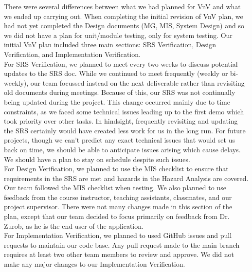 \documentclass[12pt, titlepage]{article}
\begin{document}
\indent There were several differences between what we had planned for VnV and what we ended up carrying out. When completing the initial revision of VnV plan, we had not yet completed the Design documents (MG, MIS, System Design) and so we did not have a plan for unit/module testing, only for system testing. Our initial VnV plan included three main sections: SRS Verification, Design Verification, and Implementation Verification.\\

\indent For SRS Verification, we planned to meet every two weeks to discuss potential updates to the SRS doc. While we continued to meet frequently (weekly or bi-weekly), our team focussed instead on the next deliverable rather than revisiting old documents during meetings. Because of this, our SRS was not continually being updated during the project. This change occurred mainly due to time constraints, as we faced some technical issues leading up to the first demo which took priority over other tasks. In hindsight, frequently revisiting and updating the SRS certainly would have created less work for us in the long run. For future projects, though we can't predict any exact technical issues that would set us back on time, we should be able to anticipate issues arising which cause delays. We should have a plan to stay on schedule despite such issues. \\

\indent  For Design Verification, we planned to use the MIS checklist to ensure that requirements in the SRS are met and hazards in the Hazard Analysis are covered. Our team followed the MIS checklist when testing. We also planned to use feedback from the course instructor, teaching assistants, classmates, and our project supervisor. There were not many changes made in this section of the plan, except that our team decided to focus primarily on feedback from Dr. Zurob, as he is the end-user of the application. \\

\indent For Implementation Verification, we planned to used GitHub issues and pull requests to maintain our code base. Any pull request made to the main branch requires at least two other team members to review and approve. We did not make any major changes to our Implementation Verification. 
\end{document}
